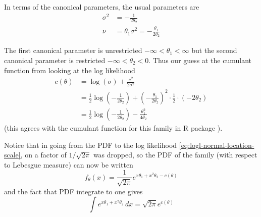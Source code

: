 In terms of the canonical parameters, the usual parameters are
\begin{align*}
   \sigma^2 & = - \frac{1}{2 \theta_2}
   \\
   \nu & = \theta_1 \sigma^2 = - \frac{\theta_1}{2 \theta_2}
\end{align*}

The first canonical parameter is unrestricted $- \infty < \theta_1 < \infty$
but the second canonical parameter is restricted $- \infty < \theta_2 < 0$.
Thus our guess at the cumulant function from looking at the log likelihood
\begin{equation} \label{eq:cumfun-normal-location-scale}
\begin{split}
   c(\theta)
   & =
   \log(\sigma) + \frac{\nu^2}{2 \sigma^2}
   \\
   & =
   \frac{1}{2} \log\left(- \frac{1}{2 \theta_2}\right)
   +
   \left( - \frac{\theta_1}{2 \theta_2} \right)^2 \cdot \frac{1}{2}
   \cdot (- 2 \theta_2)
   \\
   & =
   \frac{1}{2} \log\left(- \frac{1}{2 \theta_2}\right)
   -
   \frac{\theta_1^2}{4 \theta_2} 
\end{split}
\end{equation}
(this agrees with the cumulant function for this family
in R package ).

Notice that in going from the PDF to the log likelihood
\eqref{eq:logl-normal-location-scale}, on a factor of $1 / \sqrt{2 \pi}$
was dropped, so the PDF of the family (with respect to Lebesgue measure)
can now be written
$$
   f_\theta(x)
   =
   \frac{1}{\sqrt{2 \pi}} e^{x \theta_1 + x^2 \theta_2 - c(\theta)}
$$
and the fact that PDF integrate to one gives
$$
   \int e^{x \theta_1 + x^2 \theta_2} \, d x
   =
   \sqrt{2 \pi} e^{c(\theta)}
$$


